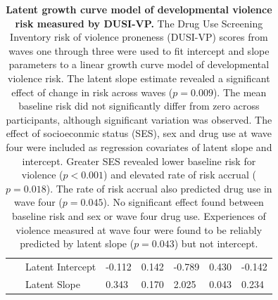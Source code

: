 \documentclass[utf8]{article}
\begin{document}
\begin{table}[h!]
\begin{tabular}{llllll}
\ \ \ Latent Intercept               & -0.112   & 0.142      & -0.789  & 0.430                    & -0.142  \\
\ \ \ Latent Slope                   & 0.343    & 0.170      & 2.025   & 0.043                    & 0.234   \\
\end{tabular}
\caption{\textbf{Latent growth curve model of developmental violence risk measured by DUSI-VP.} The Drug Use Screening Inventory risk of violence proneness (DUSI-VP) scores from waves one through three were used to fit intercept and slope parameters to a linear growth curve model of developmental violence risk. The latent slope estimate revealed a significant effect of change in risk across waves ($p=0.009$). The mean baseline risk did not significantly differ from zero across participants, although significant variation was observed. The effect of socioeconmic status (SES), sex and drug use at wave four were included as regression covariates of latent slope and intercept. Greater SES revealed lower baseline risk for violence ($p<0.001$) and elevated rate of risk accrual ($p=0.018$). The rate of risk accrual also predicted drug use in wave four ($p=0.045$). No significant effect found between baseline risk and sex or wave four drug use. Experiences of violence measured at wave four were found to be reliably predicted by latent slope ($p=0.043$) but not intercept. \label{tab:1}}
\end{table}
\end{document}
